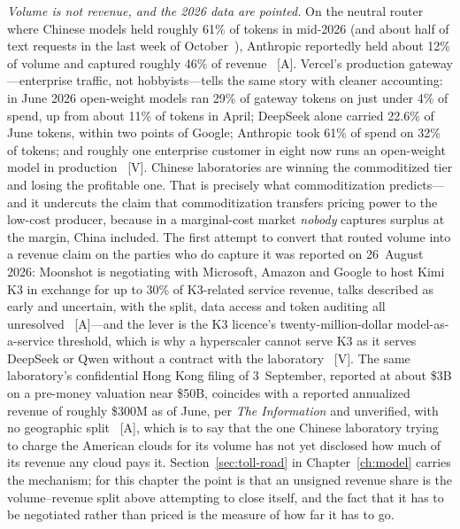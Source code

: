 \emph{Volume is not revenue, and the 2026 data are pointed.} On the neutral router where Chinese models held roughly 61\% of tokens in mid-2026 (and about half of text requests in the last week of October~\cite{mdl-openrouter-oct26}), Anthropic reportedly held about 12\% of volume and captured roughly 46\% of revenue~\cite{volume-revenue} [A]. Vercel's production gateway---enterprise traffic, not hobbyists---tells the same story with cleaner accounting: in June 2026 open-weight models ran 29\% of gateway tokens on just under 4\% of spend, up from about 11\% of tokens in April; DeepSeek alone carried 22.6\% of June tokens, within two points of Google; Anthropic took 61\% of spend on 32\% of tokens; and roughly one enterprise customer in eight now runs an open-weight model in production~\cite{vercel-gateway} [V]. Chinese laboratories are winning the commoditized tier and losing the profitable one. That is precisely what commoditization predicts---and it undercuts the claim that commoditization transfers pricing power to the low-cost producer, because in a marginal-cost market \emph{nobody} captures surplus at the margin, China included. The first attempt to convert that routed volume into a revenue claim on the parties who do capture it was reported on 26~August 2026: Moonshot is negotiating with Microsoft, Amazon and Google to host Kimi K3 in exchange for up to 30\% of K3-related service revenue, talks described as early and uncertain, with the split, data access and token auditing all unresolved~\cite{moonshot-cloud-talks} [A]---and the lever is the K3 licence's twenty-million-dollar model-as-a-service threshold, which is why a hyperscaler cannot serve K3 as it serves DeepSeek or Qwen without a contract with the laboratory~\cite{kimi-k3-license-maas} [V]. The same laboratory's confidential Hong Kong filing of 3~September, reported at about \$3B on a pre-money valuation near \$50B, coincides with a reported annualized revenue of roughly \$300M as of June, per \emph{The Information} and unverified, with no geographic split~\cite{moonshot-ipo} [A], which is to say that the one Chinese laboratory trying to charge the American clouds for its volume has not yet disclosed how much of its revenue any cloud pays it. Section~\ref{sec:toll-road} in Chapter~\ref{ch:model} carries the mechanism; for this chapter the point is that an unsigned revenue share is the volume--revenue split above attempting to close itself, and the fact that it has to be negotiated rather than priced is the measure of how far it has to go.

